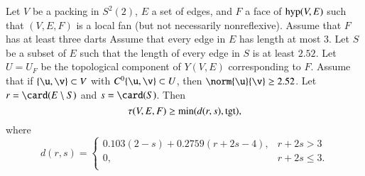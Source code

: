 \documentclass{llncs}
\def\op#1{{\hbox{#1}}}
\begin{document}
\begin{theorem}\label{lemma:main-estimate-12}
  Let $V$ be a packing in $S^2(2)$, $E$ a set of edges, and $F$ a face
  of $\op{hyp}(V,E)$ such that $(V,E,F)$ is a local fan (but not
  necessarily nonreflexive).
  Assume that $F$ has at least three
  darts Assume that every edge in $E$ has length at most $3$.  Let
  $S$ be a subset of $E$ such that the length of every edge in $S$ is
  at least $2.52$.  Let $U=U_F$ be the topological component of
  $Y(V,E)$ corresponding to $F$.  Assume that if $\{\u,\v\}\subset V$
  with $C^0\{\u,\v\}\subset U$, then %
  $\norm{\u}{\v}\ge 2.52$.
  Let $r=\card(E\setminus S)$ and $s = \card(S)$.
Then
\[\tau(V,E,F) \ge \min(d(r,s),\op{tgt}),\]
where 
\[ d(r,s) = 
\begin{cases}
0.103 (2-s) + 0.2759 (r+2s-4), & r + 2s > 3\\
0, & r + 2s \le 3.\\
\end{cases}
\] 
\end{theorem}
%
\end{document}
